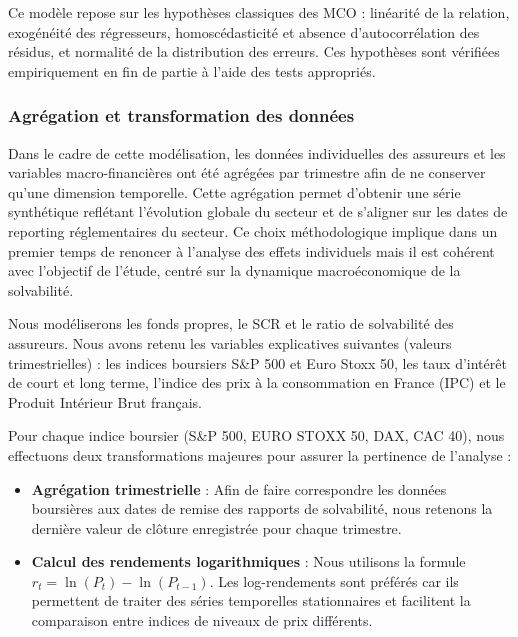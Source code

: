 \documentclass[
]{article}
\begin{document}
Ce modèle repose sur les hypothèses classiques des MCO : linéarité de la
relation, exogénéité des régresseurs, homoscédasticité et absence
d'autocorrélation des résidus, et normalité de la distribution des
erreurs. Ces hypothèses sont vérifiées empiriquement en fin de partie à
l'aide des tests appropriés.

\subsubsection{Agrégation et transformation des
données}\label{agruxe9gation-et-transformation-des-donnuxe9es}

Dans le cadre de cette modélisation, les données individuelles des
assureurs et les variables macro-financières ont été agrégées par
trimestre afin de ne conserver qu'une dimension temporelle. Cette
agrégation permet d'obtenir une série synthétique reflétant l'évolution
globale du secteur et de s'aligner sur les dates de reporting
réglementaires du secteur. Ce choix méthodologique implique dans un
premier temps de renoncer à l'analyse des effets individuels mais il est
cohérent avec l'objectif de l'étude, centré sur la dynamique
macroéconomique de la solvabilité.

Nous modéliserons les fonds propres, le SCR et le ratio de solvabilité
des assureurs. Nous avons retenu les variables explicatives suivantes
(valeurs trimestrielles) : les indices boursiers S\&P 500 et Euro Stoxx
50, les taux d'intérêt de court et long terme, l'indice des prix à la
consommation en France (IPC) et le Produit Intérieur Brut français.

Pour chaque indice boursier (S\&P 500, EURO STOXX 50, DAX, CAC 40), nous
effectuons deux transformations majeures pour assurer la pertinence de
l'analyse :

\begin{itemize}
  \item \textbf{Agrégation trimestrielle} : Afin de faire correspondre les données boursières aux dates de remise des rapports de solvabilité, nous retenons la dernière valeur de clôture enregistrée pour chaque trimestre.
  \item \textbf{Calcul des rendements logarithmiques} : Nous utilisons la formule $r_t = \ln(P_t) - \ln(P_{t-1})$. Les log-rendements sont préférés car ils permettent de traiter des séries temporelles stationnaires et facilitent la comparaison entre indices de niveaux de prix différents.
\end{itemize}
\end{document}
